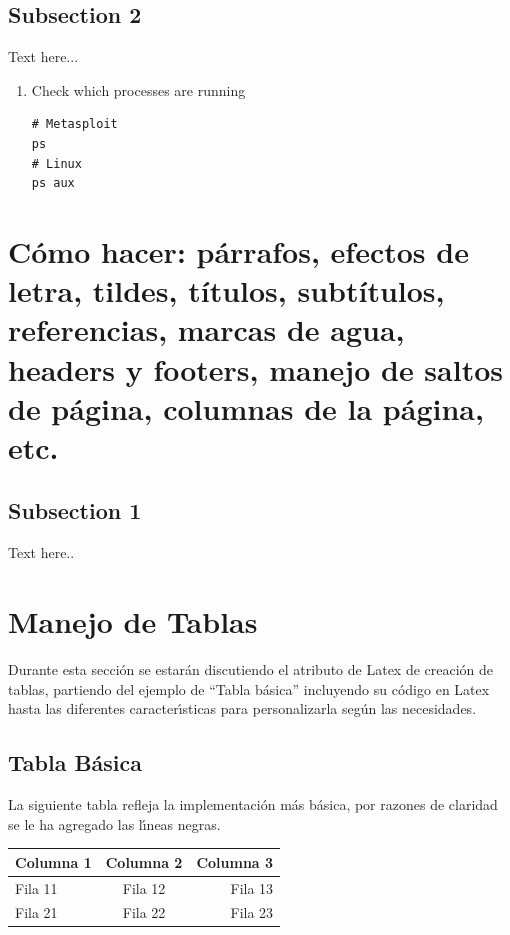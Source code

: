 \documentclass[letterpaper, 10pt, journal]{IEEEtran}
\begin{document}
\subsection{Subsection 2}
Text here...
\begin{enumerate}
\item Check which processes are running
\lstset{language=Java}
\begin{lstlisting}
# Metasploit
ps
# Linux
ps aux
\end{lstlisting}
\end{enumerate}


\section{C\'omo hacer: p\'arrafos, efectos de letra, tildes, t\'itulos, subt\'itulos, referencias, marcas de agua, headers y footers, manejo de saltos de p\'agina, columnas de la p\'agina, etc.}
\subsection{Subsection 1}
Text here..

\section{Manejo de Tablas}
Durante esta secci\'{o}n se estar\'{a}n discutiendo el atributo de Latex de creaci\'{o}n de tablas, partiendo del ejemplo de \textquotedblleft{}Tabla b\'{a}sica\textquotedblright{} incluyendo su c\'{o}digo en Latex hasta las diferentes caracter\'{\i}sticas para personalizarla seg\'{u}n las necesidades.

\subsection{Tabla B\'asica}
La siguiente tabla refleja la implementaci\'{o}n m\'{a}s b\'{a}sica, por razones de claridad se le ha agregado las l\'{\i}neas negras.

\begin{table}[H]\centering
\begin{tabular}{|l c|r|}
\hline
Columna 1 & Columna 2 & Columna 3 \\ \hline
Fila 11   & Fila 12   & Fila 13   \\ \hline
Fila 21   & Fila 22   & Fila 23   \\ \hline
\end{tabular}
\end{table}
\end{document}
